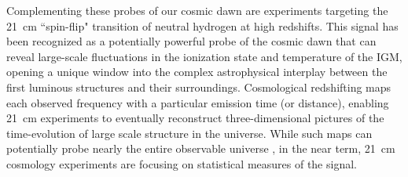 \documentclass[twocolumn,numberedappendix]{emulateapj} \shorttitle{New Limits on the 21 cm Power Spectrum at $z=8.4$}
\begin{document}
Complementing these probes of our cosmic dawn are experiments targeting
the 21~cm ``spin-flip" transition of neutral hydrogen at high redshifts.
This signal has been recognized as a potentially powerful probe
of the cosmic dawn \citep{furlanetto_et_al2006,morales_wyithe2010,pritchard_loeb2012} that can reveal
large-scale fluctuations in the ionization state and temperature of the IGM, opening
a unique window into the complex astrophysical interplay between the first luminous
structures and their surroundings.
Cosmological redshifting maps 
each observed frequency with a particular emission time (or distance), enabling 21~cm experiments 
to eventually reconstruct 
three-dimensional pictures of the time-evolution of large scale structure in the universe. 
While such maps can potentially probe nearly the entire observable universe \citep{mao_et_al2008},
in the near term, 21~cm cosmology experiments are focusing on statistical measures
of the signal.

\end{document}
